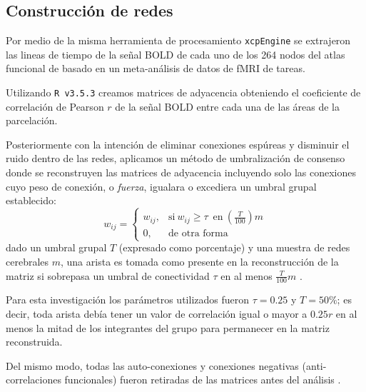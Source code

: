 \subsection{Construcción de redes}
Por medio de la misma herramienta de procesamiento \texttt{xcpEngine} se extrajeron las lineas de tiempo de la señal BOLD de cada uno de los 264 nodos del atlas funcional de \parencite{Power2011} basado en un meta-análisis de datos de fMRI de tareas.\par
Utilizando \texttt{R v3.5.3} \parencite{R2019,Rstudio2018} creamos matrices de  adyacencia obteniendo el coeficiente de correlación de Pearson $r$ de la señal BOLD entre cada una de las áreas de la parcelación.\par
Posteriormente con la intención de eliminar conexiones espúreas y disminuir el ruido dentro de las redes, aplicamos un método de umbralización de consenso donde se reconstruyen las matrices de adyacencia incluyendo solo las conexiones cuyo peso de conexión, o \emph{fuerza}, igualara o excediera un umbral grupal establecido:
\begin{equation}
    \label{eqn:threshold}
    w_{ij}=
    \begin{cases}
        w_{ij}, & \text{si}\ w_{ij} \geq \tau \enspace \text{en}\ (\frac{T}{100})m \\
        0, & \text{de otra forma}
    \end{cases}
\end{equation}
dado un umbral grupal $T$ (expresado como porcentaje) y una muestra de redes cerebrales $m$, una arista es tomada como presente en la reconstrucción de la matriz si sobrepasa un umbral de conectividad $\tau$ en al menos $\frac{T}{100}m$ \parencite{DeReus2013}. \par
Para esta investigación los parámetros utilizados fueron $\tau = 0.25$ y $T = 50\%$; es decir, toda arista debía tener un valor de correlación igual o mayor a $0.25r$ en al menos la mitad de los integrantes del grupo para permanecer en la matriz reconstruida.\par
Del mismo modo, todas las auto-conexiones y conexiones negativas (anti-correlaciones funcionales) fueron retiradas de las matrices antes del análisis \parencite{Rubinov2010}.

